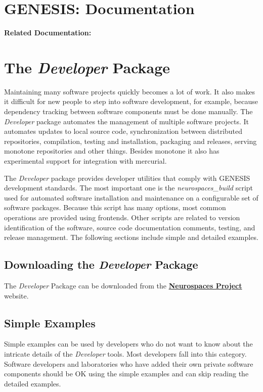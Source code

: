 \documentclass[12pt]{article}
\begin{document}
\section*{GENESIS: Documentation}

{\bf Related Documentation:}

\section*{The {\it Developer} Package}

Maintaining many software projects quickly becomes a lot of work.  It
also makes it difficult for new people to step into software
development, for example, because dependency tracking between software
components must be done manually.  The {\it Developer} package
automates the management of multiple software projects.  It automates
updates to local source code, synchronization between distributed
repositories, compilation, testing and installation, packaging and
releases, serving monotone repositories and other things.  Besides
monotone it also has experimental support for integration with
mercurial.

The {\it Developer} package provides developer utilities that comply with GENESIS development standards. The most important one is the {\it
  neurospaces\_build} script used for automated software installation and maintenance on a configurable set of software packages.  Because
this script has many options, most common operations are provided using frontends.  Other scripts are related to version identification of the software, source code documentation comments, testing, and release management. The following sections include simple and detailed examples. 

\subsection*{Downloading the  {\it Developer} Package}
The {\it Developer} Package can be downloaded from the \href{http://sourceforge.net/projects/neurospaces/files/}{\bf Neurospaces Project} website.

\subsection*{Simple Examples}
Simple examples can be used by developers who do not want to know about the intricate details of the {\it Developer} tools.  Most developers fall into this category. Software developers and laboratories who have added their own private software components should be OK using the simple examples and can skip reading the detailed examples.
\end{document}
